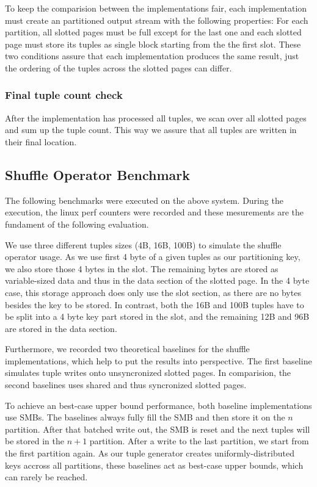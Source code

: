 To keep the comparision between the implementations fair, each implementation must create an partitioned output stream with the following properties: For each partition, all slotted pages must be full except for the last one and each slotted page must store its tuples as single block starting from the the first slot.
These two conditions assure that each implementation produces the same result, just the ordering of the tuples across the slotted pages can differ.
\subsubsection{Final tuple count check}
After the implementation has processed all tuples, we scan over all slotted pages and sum up the tuple count.
This way we assure that all tuples are written in their final location.

\subsection{Shuffle Operator Benchmark}
The following benchmarks were executed on the above system.
During the execution, the linux perf counters were recorded and these mesurements are the fundament of the following evaluation.

We use three different tuples sizes (4B, 16B, 100B) to simulate the shuffle operator usage.
As we use first 4 byte of a given tuples as our partitioning key, we also store those 4 bytes in the slot.
The remaining bytes are stored as variable-sized data and thus in the data section of the slotted page.
In the 4 byte case, this storage approach does only use the slot section, as there are no bytes besides the key to be stored.
In contrast, both the 16B and 100B tuples have to be split into a 4 byte key part stored in the slot, and the remaining 12B and 96B are stored in the data section.

Furthermore, we recorded two theoretical baselines for the shuffle implementations, which help to put the results into perspective.
The first baseline simulates tuple writes onto unsyncronized slotted pages.
In comparision, the second baselines uses shared and thus syncronized slotted pages.

To achieve an best-case upper bound performance, both baseline implementations use \acfp{SMB}.
The baselines always fully fill the \ac{SMB} and then store it on the $n$ partition.
After that batched write out, the \ac{SMB} is reset and the next tuples will be stored in the $n+1$ partition.
After a write to the last partition, we start from the first partition again.
As our tuple generator creates uniformly-distributed keys accross all partitions, these baselines act as best-case upper bounds, which can rarely be reached.

